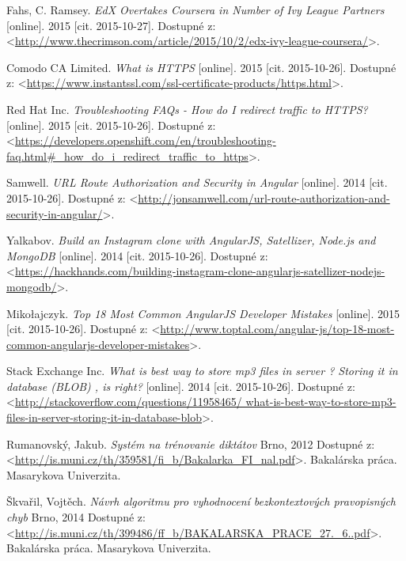 \documentclass[12pt,oneside]{fithesis2}
\begin{document}
    \begin{thebibliography}{59}
    
  		Fahs, C. Ramsey.
  		\emph{EdX Overtakes Coursera in Number of Ivy League Partners}
  		[online].
  		2015
  		[cit. 2015-10-27].
  		Dostupné z: <\url{http://www.thecrimson.com/article/2015/10/2/edx-ivy-league-coursera/}>.

  		Comodo CA Limited.
  		\emph{What is HTTPS}
  		[online].
  		2015
  		[cit. 2015-10-26].
  		Dostupné z: <\url{https://www.instantssl.com/ssl-certificate-products/https.html}>.
	
  		Red Hat Inc.
  		\emph{Troubleshooting FAQs - How do I redirect traffic to HTTPS?}
  		[online].
  		2015
  		[cit. 2015-10-26].
  		Dostupné z: <\url{https://developers.openshift.com/en/troubleshooting-faq.html#_how_do_i_redirect_traffic_to_https}>.
  		
  		Samwell.
  		\emph{URL Route Authorization and Security in Angular}
  		[online].
  		2014
  		[cit. 2015-10-26].
  		Dostupné z: <\url{http://jonsamwell.com/url-route-authorization-and-security-in-angular/}>.
  		
  		Yalkabov.
  		\emph{Build an Instagram clone with AngularJS, Satellizer, Node.js and MongoDB}
  		[online].
  		2014
  		[cit. 2015-10-26].
  		Dostupné z: <\url{https://hackhands.com/building-instagram-clone-angularjs-satellizer-nodejs-mongodb/}>.
  		
  		Mikołajczyk.
  		\emph{Top 18 Most Common AngularJS Developer Mistakes}
  		[online].
  		2015
  		[cit. 2015-10-26].
  		Dostupné z: <\url{http://www.toptal.com/angular-js/top-18-most-common-angularjs-developer-mistakes}>.
  			
  		Stack Exchange Inc.
  		\emph{What is best way to store mp3 files in server ? Storing it in database (BLOB) , is right?}
  		[online].
  		2014
  		[cit. 2015-10-26].
  		Dostupné z: <\url{http://stackoverflow.com/questions/11958465/
  		what-is-best-way-to-store-mp3-files-in-server-storing-it-in-database-blob}>.
  		
  		Rumanovský, Jakub.
  		\emph{Systém na trénovanie diktátov}
  		Brno, 
  		2012
  		Dostupné z: <\url{http://is.muni.cz/th/359581/fi_b/Bakalarka_FI_nal.pdf}>.
  		Bakalárska práca. Masarykova Univerzita.
  		
  		Škvařil, Vojtěch.
  		\emph{Návrh algoritmu pro vyhodnocení bezkontextových pravopisných chyb}
  		Brno, 
  		2014
  		Dostupné z: <\url{http://is.muni.cz/th/399486/ff_b/BAKALARSKA_PRACE_27._6..pdf}>.
  		Bakalárska práca. Masarykova Univerzita.
  		

\end{thebibliography}
\end{document}
